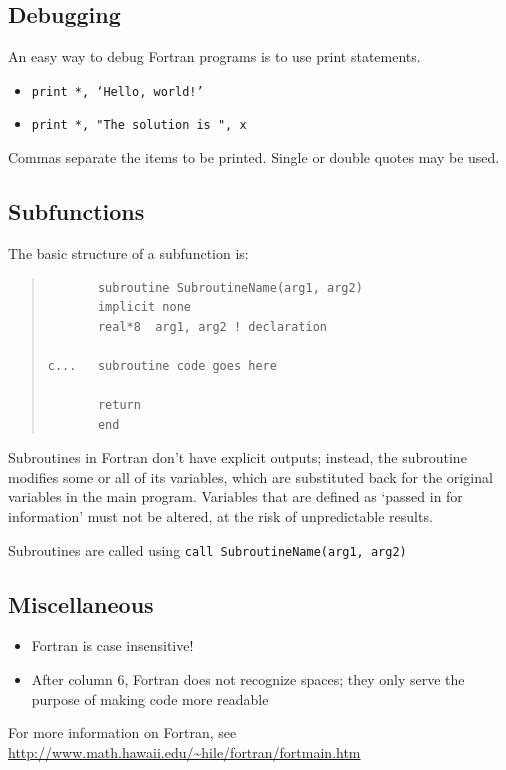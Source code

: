 \documentclass[10pt,letterpaper,oneside]{report}
\begin{document}
\begin{itemize}
\subsection{Debugging}
An easy way to debug Fortran programs is to use print statements. 
\begin{itemize}
\item \texttt{print *, `Hello, world!'}
\item \texttt{print *, "The solution is ", x}
\end{itemize} 
Commas separate the items to be printed.  Single or double quotes may be used.

\subsection{Subfunctions}
The basic structure of a subfunction is: 

\begin{quote} \begin{lstlisting}
       subroutine SubroutineName(arg1, arg2)
       implicit none
       real*8  arg1, arg2 ! declaration

c...   subroutine code goes here 

       return
       end
\end{lstlisting} \end{quote}

Subroutines in Fortran don't have explicit outputs; instead, the subroutine modifies some or all of its variables, which are substituted back for the original variables in the main program.  Variables that are defined as `passed in for information' must not be altered, at the risk of unpredictable results.

Subroutines are called using \texttt{call SubroutineName(arg1, arg2)}

\subsection{Miscellaneous}
\begin{itemize}
\item Fortran is case insensitive!  
\item After column 6, Fortran does not recognize spaces; they only serve the purpose of making code more readable
\end{itemize}

For more information on Fortran, see \url{http://www.math.hawaii.edu/~hile/fortran/fortmain.htm}




\end{itemize}
\end{document}
